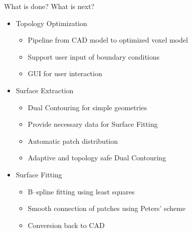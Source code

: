 \begin{frame}{What is done? What is next?}
\begin{itemize}

\item<+-> Topology Optimization
\begin{itemize}
	\item[\textcolor{green}{\Checkmark}] Pipeline from CAD model to optimized voxel model
	\item[\textcolor{green}{\Checkmark}] Support user input of boundary conditions
	\item[\textcolor{red}{\XSolidBrush}] GUI for user interaction
\end{itemize}

\item<+-> Surface Extraction
\begin{itemize}
	\item[\textcolor{green}{\Checkmark}] Dual Contouring for simple geometries
	\item[\textcolor{green}{\Checkmark}] Provide necessary data for Surface Fitting
	\item[\textcolor{black}{\VarClock}] Automatic patch distribution
	\item[\textcolor{red}{\XSolidBrush}] Adaptive and topology safe Dual Contouring
\end{itemize}

\item<+-> Surface Fitting
\begin{itemize}
	\item[\textcolor{green}{\Checkmark}] B--spline fitting using least squares
	\item[\textcolor{green}{\Checkmark}] Smooth connection of patches using Peters' scheme
	\item[\textcolor{red}{\XSolidBrush}] Conversion back to CAD
\end{itemize}
\end{itemize}
\end{frame}

